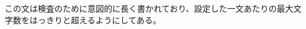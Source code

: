 \documentclass{jsarticle}
\begin{document}
この文は検査のために意図的に長く書かれており、設定した一文あたりの最大文字数をはっきりと超えるようにしてある。
\end{document}
